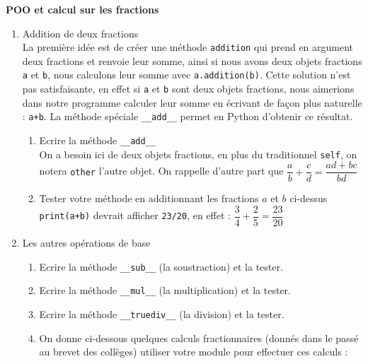 \documentclass[11pt,a4paper]{article}
\begin{document}
\begin{Exo}{\textbf{POO et calcul sur les fractions}}
\begin{enumerate}
	\begin{enumerate}
		\item Ecrire une méthode spéciale permettant de renvoyer la chaine de caractère {\tt 'a/b'} à partir de l'objet représentant la fraction $\dfrac{a}{b}$
		\item Affiner cette méthode de façon à ce qu'une fraction ayant pour dénominateur 1 affiche simplement son numérateur.
		\item Tester votre méthode sur les fractions $a, b, c$ et $d$ définies ci-dessus.
	\end{enumerate}
	\item Addition de deux fractions \\
	La première idée est de créer une méthode {\tt addition} qui prend en argument deux fractions et renvoie leur somme, ainsi si nous avons deux objets fractions {\tt a} et {\tt b}, nous calculons leur somme avec {\tt a.addition(b)}. Cette solution n'est pas satisfaisante, en effet si {\tt a} et {\tt b} sont deux objets fractions, nous aimerions dans notre programme calculer leur somme en écrivant de façon plus naturelle : {\tt a+b}. La méthode spéciale {\tt \_\_add\_\_} permet en Python d'obtenir ce résultat.
	\begin{enumerate}
		\item Ecrire la méthode {\tt \_\_add\_\_} \\
	\aide \; On a besoin ici de deux objets fractions, en plus du traditionnel {\tt self}, on notera {\tt other} l'autre objet. On rappelle d'autre part que $\dfrac{a}{b} + \dfrac{c}{d} = \dfrac{ad+bc}{bd} $
		\item Tester votre méthode en additionnant les fractions $a$ et $b$ ci-dessus \\
	\aide \; {\tt print(a+b)} devrait afficher {\tt 23/20}, en effet : $\dfrac{3}{4}+\dfrac{2}{5} = \dfrac{23}{20}$
		\end{enumerate}
	\item Les autres opérations de base
	\begin{enumerate}
		\item Ecrire la méthode {\tt \_\_sub\_\_} (la soustraction) et la tester.
		\item Ecrire la méthode {\tt \_\_mul\_\_} (la multiplication) et la tester.
		\item Ecrire la méthode {\tt \_\_truediv\_\_} (la division) et la tester.
		\item On donne ci-dessous quelques calculs fractionnaires (donnés dans le passé au brevet des collèges) utiliser votre module pour effectuer ces calculs :\\

\end{enumerate}
\end{enumerate}
\end{Exo}
\end{document}
